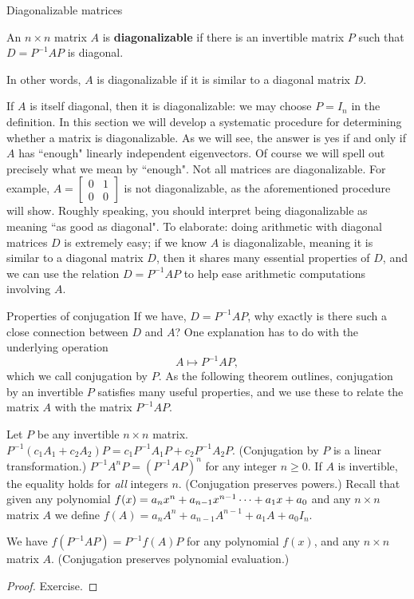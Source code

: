\begin{frame}{Diagonalizable matrices}
\begin{definition}
An $n\times n$ matrix $A$ is {\bf diagonalizable} if there is an invertible matrix $P$ such that $D=P^{-1}AP$ is diagonal. 

In other words, $A$ is diagonalizable if it is \alert{similar} to a diagonal matrix $D$. 
\end{definition}
 \pause
 \begin{comments}
 \bb
 \ii If $A$ is itself diagonal, then it is diagonalizable: we may choose $P=I_n$ in the definition. 
 \pause\ii In this section we will develop a systematic procedure for determining whether a matrix is diagonalizable. As we will see, the answer is yes if and only if $A$ has ``enough" linearly independent eigenvectors. Of course we will spell out precisely what we mean by ``enough". 
 \pause\ii Not all matrices are diagonalizable. For example, $A=\begin{bmatrix}
 0&1\\
 0&0
 \end{bmatrix}$ is not diagonalizable, as the aforementioned procedure will show. 
 \pause\ii Roughly speaking, you should interpret being diagonalizable as meaning ``as good as diagonal". To elaborate: doing arithmetic with diagonal matrices $D$ is extremely easy; if we know $A$ is diagonalizable, meaning it is similar to a diagonal matrix $D$, then it shares many essential properties of $D$, and we can use the relation $D=P^{-1}AP$ to help ease arithmetic computations involving $A$.   \ee
 \end{comments}
\end{frame}
\begin{frame}{Properties of conjugation}
If we have, $D=P^{-1}AP$, why exactly is there such a close connection between $D$ and $A$? One explanation has to do with the underlying operation  
\[
A\longmapsto P^{-1}AP,
\]
which we call \alert{conjugation by $P$}.  As the following theorem outlines, conjugation by an invertible $P$ satisfies many useful properties, and we use these to relate the matrix $A$ with the matrix $P^{-1}AP$. 
\pause
\begin{theorem}\label{th:conjugation}
Let $P$ be any invertible $n\times n$ matrix. 
\bb
\ii $P^{-1}(c_1A_1+c_2A_2)P=c_1P^{-1}A_1P+c_2P^{-1}A_2P$. (\alert{Conjugation by $P$ is a linear transformation}.) 
\ii $P^{-1}A^nP=(P^{-1}AP)^n$ for any integer $n\geq 0$. If $A$ is invertible, the equality holds for {\em all} integers $n$. (\alert{Conjugation preserves powers}.) 
\ii Recall that given any polynomial $f(x)=a_nx^n+a_{n-1}x^{n-1}\cdots +a_1x+a_0$ and any $n\times n$ matrix $A$ we define $f(A)=a_nA^n+a_{n-1}A^{n-1}+a_1A+a_0I_n$. 

We have $f(P^{-1}AP)=P^{-1}f(A)P$ for any polynomial $f(x)$, and any $n\times n$ matrix $A$. (\alert{Conjugation preserves polynomial evaluation}.) 
\ee
\end{theorem}
\pause
\begin{proof}
Exercise.
\end{proof}
\end{frame}
